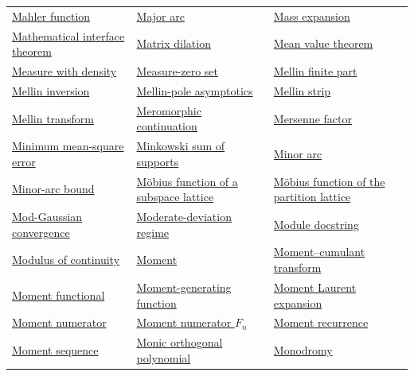 \documentclass[11pt,oneside]{article}
\begin{document}
\begin{longtable}{L{0.31\textwidth}L{0.31\textwidth}L{0.31\textwidth}}
\hyperlink{gls:mahler-function}{Mahler function} & \hyperlink{gls:major-arc}{Major arc} & \hyperlink{gls:mass-expansion}{Mass expansion} \\
\hyperlink{gls:mathematical-interface-theorem}{Mathematical interface theorem} & \hyperlink{gls:matrix-dilation}{Matrix dilation} & \hyperlink{gls:mean-value-theorem}{Mean value theorem} \\
\hyperlink{gls:with-density-measure}{Measure with density} & \hyperlink{gls:measure-zero-set}{Measure-zero set} & \hyperlink{gls:mellin-finite-part}{Mellin finite part} \\
\hyperlink{gls:mellin-inversion}{Mellin inversion} & \hyperlink{gls:mellin-pole-asymptotics}{Mellin-pole asymptotics} & \hyperlink{gls:mellin-strip}{Mellin strip} \\
\hyperlink{gls:mellin-transform}{Mellin transform} & \hyperlink{gls:meromorphic-continuation}{Meromorphic continuation} & \hyperlink{gls:mersenne-factor}{Mersenne factor} \\
\hyperlink{gls:minimum-mean-square-error}{Minimum mean-square error} & \hyperlink{gls:minkowski-sum-of-supports}{Minkowski sum of supports} & \hyperlink{gls:minor-arc}{Minor arc} \\
\hyperlink{gls:minor-arc-bound}{Minor-arc bound} & \hyperlink{gls:subspace-lattice-mobius-function}{M\"obius function of a subspace lattice} & \hyperlink{gls:partition-lattice-mobius-function}{M\"obius function of the partition lattice} \\
\hyperlink{gls:mod-gaussian-convergence}{Mod-Gaussian convergence} & \hyperlink{gls:moderate-deviation-regime}{Moderate-deviation regime} & \hyperlink{gls:module-docstring}{Module docstring} \\
\hyperlink{gls:modulus-of-continuity}{Modulus of continuity} & \hyperlink{gls:moment}{Moment} & \hyperlink{gls:moment-cumulant-transform}{Moment--cumulant transform} \\
\hyperlink{gls:moment-functional}{Moment functional} & \hyperlink{gls:moment-generating-function}{Moment-generating function} & \hyperlink{gls:moment-laurent-expansion}{Moment Laurent expansion} \\
\hyperlink{gls:moment-numerator}{Moment numerator} & \hyperlink{gls:moment-numerator-f}{Moment numerator $F_n$} & \hyperlink{gls:moment-recurrence}{Moment recurrence} \\
\hyperlink{gls:moment-sequence}{Moment sequence} & \hyperlink{gls:monic-orthogonal-polynomial}{Monic orthogonal polynomial} & \hyperlink{gls:monodromy}{Monodromy} \\

\end{longtable}
\end{document}
